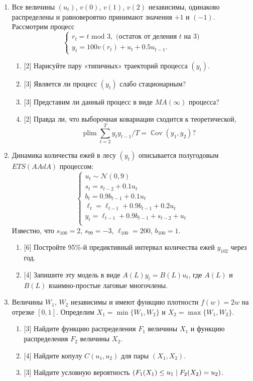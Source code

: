 \documentclass[12pt]{article}
\DeclareMathOperator{\Cov}{\mathbb{C}ov}
\let\P\relax
\DeclareMathOperator{\P}{\mathbb{P}}
\DeclareMathOperator{\plim}{plim}
\newcommand{\cN}{\mathcal{N}}
\begin{document}
\begin{enumerate}
    \item Все величины $(u_t)$, $v(0)$, $v(1)$, $v(2)$ независимы, одинаково распределены и равновероятно принимают значения $+1$ и $(-1)$.
    Рассмотрим процесс 
    \[
    \begin{cases} 
        r_t = t \text{ mod } 3, \text{ (остаток от деления }t \text{ на 3)} \\
        y_t = 100 v(r_t) + u_t + 0.5u_{t-1}.   
    \end{cases}
    \]
    \begin{enumerate}
        \item {[2]} Нарисуйте пару «типичных» траекторий процесса $(y_t)$. 
        \item {[3]} Является ли процесс $(y_t)$ слабо стационарным?
        \item {[3]} Представим ли данный процесс в виде $MA(\infty)$ процесса?
        \item {[2]} Правда ли, что выборочная ковариации сходится к теоретической,
        \[
        \plim \sum_{t=2}^T y_t y_{t-1} / T = \Cov(y_1, y_2)?
        \]
    \end{enumerate}

    \item Динамика количества ежей в лесу $(y_t)$ описывается полугодовым $ETS(AAdA)$ процессом:
    \[
    \begin{cases}
        u_t \sim \cN(0, 9) \\
        s_t = s_{t-2} + 0.1 u_t \\
        b_t = 0.9b_{t-1} + 0.1 u_t \\
        \ell_t = \ell_{t-1} + 0.9b_{t-1} + 0.2 u_t \\
        y_t = \ell_{t-1} + 0.9b_{t-1} + s_{t-2} + u_t \\
    \end{cases}    
    \]
    Известно, что $s_{100} = 2$, $s_{99} = -3$, $\ell_{100} = 200$, $b_{100} = 1$.
    \begin{enumerate}
      \item {[6]} Постройте 95\%-й предиктивный интервал количества ежей $y_{102}$ через год.
      \item {[4]} Запишите эту модель в виде $A(L) y_t = B(L) u_t$, где $A(L)$ и $B(L)$ взаимно-простые лаговые многочлены.
    \end{enumerate}
  
    \item Величины $W_1$, $W_2$ независимы и имеют функцию плотности $f(w) = 2w$ на отрезке $[0, 1]$.
    Определим $X_1 = \min \{W_1, W_2\}$ и $X_2 = \max \{W_1, W_2\}$.
    \begin{enumerate}
        \item {[3]} Найдите функцию распределения $F_1$ величины $X_1$ и функцию распределения $F_2$ величины $X_2$.
        \item {[4]} Найдите копулу $C(u_1, u_2)$ для пары $(X_1, X_2)$.
        \item {[3]} Найдите условную вероятность $\P(F_1(X_1) \leq u_1 \mid F_2(X_2) = u_2)$.
    \end{enumerate}



\end{enumerate}
\end{document}
